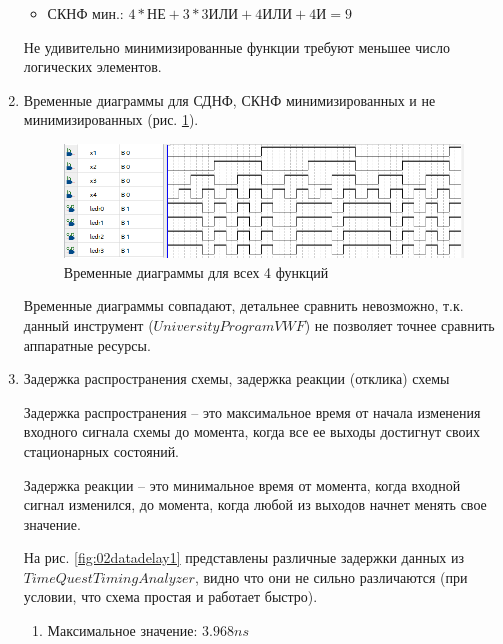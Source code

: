 \documentclass[a4paper,14pt]{article}
\begin{document}
\begin{enumerate}
\begin{itemize}
		\item СКНФ мин.: $ 4 * \text{НЕ} + 3 * \text{3ИЛИ} + \text{4ИЛИ} + \text{4И} = 9$
		
	\end{itemize}

	Не удивительно минимизированные функции требуют меньшее число логических элементов.

	\item Временные диаграммы для СДНФ, СКНФ минимизированных и не минимизированных (рис. \ref{fig:02wvf}).
	
	\begin{figure}[H]
		\centering
		\includegraphics[width=0.7\linewidth]{image/02_wvf}
		\caption{Временные диаграммы для всех 4 функций}
		\label{fig:02wvf}
	\end{figure}
	 
	Временные диаграммы совпадают, детальнее сравнить невозможно, т.к. данный инструмент ($University Program VWF$) не позволяет точнее сравнить аппаратные ресурсы.
	
	\item Задержка распространения схемы, задержка реакции (отклика) схемы
	
	Задержка распространения -- это максимальное время от начала изменения входного сигнала схемы до момента, когда	все ее выходы достигнут своих стационарных состояний.
	
	Задержка реакции -- это	минимальное время от момента, когда входной сигнал изменился, до момента, когда любой из выходов начнет менять свое значение.
	
	
	На рис. \ref{fig:02datadelay1} представлены различные задержки данных из $TimeQuest Timing Analyzer$, видно что они не сильно различаются (при условии, что схема простая и работает быстро).
	
	\begin{enumerate}
		\item Максимальное значение: $3.968ns$
		

\end{enumerate}
\end{enumerate}
\end{document}
